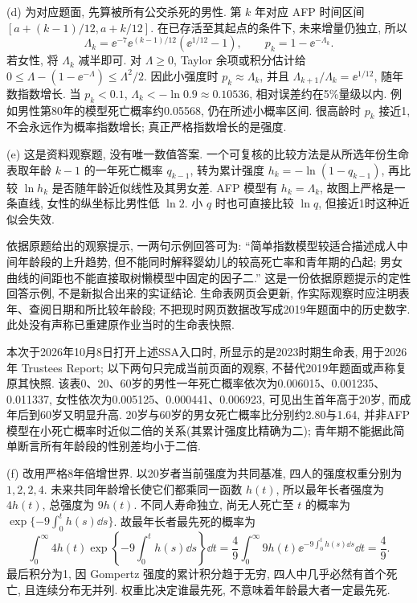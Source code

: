 \begin{solution}
(d) 为对应题面, 先算被所有公交杀死的男性. 第 $k$ 年对应 AFP 时间区间
$[a+(k-1)/12,a+k/12]$. 在已存活至其起点的条件下, 未来增量仍独立, 所以
\[
\Lambda_k=\ee^{-7}\ee^{(k-1)/12}(\ee^{1/12}-1),\qquad
p_k=1-\ee^{-\Lambda_k}.
\]
若女性, 将 $\Lambda_k$ 减半即可. 对 $\Lambda\ge0$, Taylor 余项或积分估计给
$0\le\Lambda-(1-\ee^{-\Lambda})\le\Lambda^2/2$.
因此小强度时 $p_k\approx\Lambda_k$, 并且 $\Lambda_{k+1}/\Lambda_k=\ee^{1/12}$, 随年数指数增长. 当 $p_k<0.1$, $\Lambda_k<-\ln0.9\approx0.10536$, 相对误差约在5\%量级以内. 例如男性第80年的模型死亡概率约0.05568, 仍在所述小概率区间. 很高龄时 $p_k$ 接近1, 不会永远作为概率指数增长; 真正严格指数增长的是强度.

(e) 这是资料观察题, 没有唯一数值答案. 一个可复核的比较方法是从所选年份生命表取年龄 $k-1$ 的一年死亡概率 $q_{k-1}$, 转为累计强度 $h_k=-\ln(1-q_{k-1})$, 再比较 $\ln h_k$ 是否随年龄近似线性及其男女差. AFP 模型有 $h_k=\Lambda_k$, 故图上严格是一条直线, 女性的纵坐标比男性低 $\ln2$. 小 $q$ 时也可直接比较 $\ln q$, 但接近1时这种近似会失效.

依据原题给出的观察提示, 一两句示例回答可为: “简单指数模型较适合描述成人中间年龄段的上升趋势, 但不能同时解释婴幼儿的较高死亡率和青年期的凸起; 男女曲线的间距也不能直接取树懒模型中固定的因子二.” 这是一份依据原题提示的定性回答示例, 不是新拟合出来的实证结论. 生命表网页会更新, 作实际观察时应注明表年、查阅日期和所比较年龄段; 不把现时网页数据改写成2019年题面中的历史数字. 此处没有声称已重建原作业当时的生命表快照.

本次于2026年10月8日打开上述SSA入口时, 所显示的是2023时期生命表, 用于2026年 Trustees Report; 以下两句只完成当前页面的观察, 不替代2019年题面或声称复原其快照. 该表0、20、60岁的男性一年死亡概率依次为0.006015、0.001235、0.011337, 女性依次为0.005125、0.000441、0.006923, 可见出生首年高于20岁, 而成年后到60岁又明显升高. 20岁与60岁的男女死亡概率比分别约2.80与1.64, 并非AFP模型在小死亡概率时近似二倍的关系(其累计强度比精确为二); 青年期不能据此简单断言所有年龄段的性别差均小于二倍.

(f) 改用严格8年倍增世界. 以20岁者当前强度为共同基准, 四人的强度权重分别为 $1,2,2,4$. 未来共同年龄增长使它们都乘同一函数 $h(t)$, 所以最年长者强度为 $4h(t)$, 总强度为 $9h(t)$. 不同人寿命独立, 尚无人死亡至 $t$ 的概率为
$\exp\{-9\int_0^t h(s)\dd s\}$.
故最年长者最先死的概率为
\[
\int_0^\infty4h(t)\exp\left\{-9\int_0^th(s)\dd s\right\}\dd t
=\frac49\int_0^\infty9h(t)\ee^{-9\int_0^t h(s)\dd s}\dd t=\frac49.
\]
最后积分为1, 因 Gompertz 强度的累计积分趋于无穷, 四人中几乎必然有首个死亡, 且连续分布无并列. 权重比决定谁最先死, 不意味着年龄最大者一定最先死.
\end{solution}

